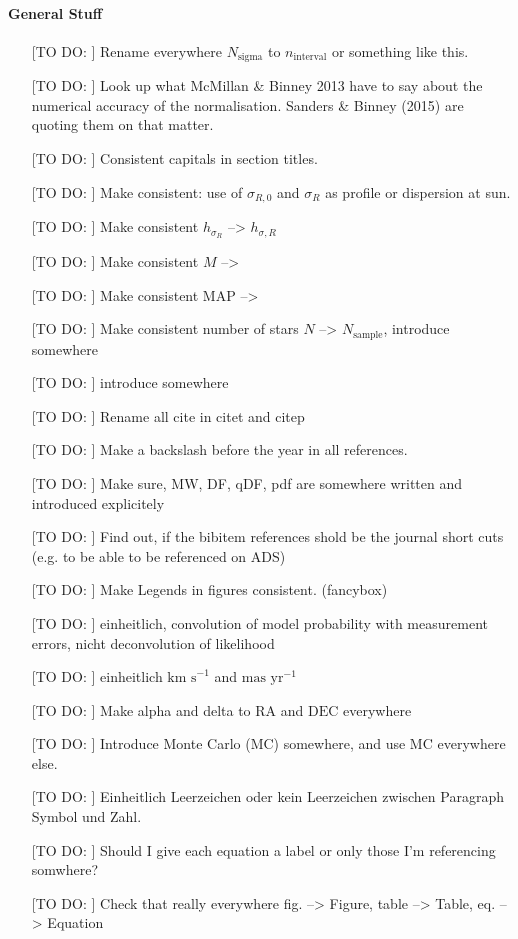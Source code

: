 \paragraph{General Stuff}
\begin{itemize}
\item[[TO DO:]] Rename everywhere $N_\text{sigma}$ to $n_\text{interval}$ or something like this.
\item[[TO DO:]] Look up what McMillan \& Binney 2013 have to say about the numerical accuracy of the normalisation. Sanders \& Binney (2015) are quoting them on that matter.
\item[[TO DO:]] Consistent capitals in section titles.
\item[[TO DO:]] Make consistent: use of $\sigma_{R,0}$ and $\sigma_R$ as profile or dispersion at sun.
\item[[TO DO:]] Make consistent $h_{\sigma_R}$ --> $h_{\sigma,R}$
\item[[TO DO:]] Make consistent $M$ --> \pmodel
\item[[TO DO:]] Make consistent MAP --> \MAP
\item[[TO DO:]] Make consistent number of stars $N$ --> $N_\text{sample}$, introduce somewhere
\item[[TO DO:]]  introduce \pdf somewhere
\item[[TO DO:]]  Rename all cite in citet and citep
\item[[TO DO:]] Make a backslash before the year in all references.
\item[[TO DO:]] Make sure, MW, DF, qDF, pdf are somewhere written and introduced explicitely
\item[[TO DO:]] Find out, if the bibitem references shold be the journal short cuts (e.g. to be able to be referenced on ADS)
\item[[TO DO:]] Make Legends in figures consistent. (fancybox)
\item[[TO DO:]] einheitlich, convolution of model probability with measurement errors, nicht deconvolution of likelihood
\item[[TO DO:]] einheitlich $\text{km s}^{-1}$ and $\text{mas yr}^{-1}$
\item[[TO DO:]] Make alpha and delta to $\text{RA}$ and $\text{DEC}$ everywhere
\item[[TO DO:]] Introduce Monte Carlo (MC) somewhere, and use MC everywhere else.
\item[[TO DO:]] Einheitlich Leerzeichen oder kein Leerzeichen zwischen Paragraph Symbol und Zahl.
\item[[TO DO:]] Should I give each equation a label or only those I'm referencing somwhere?
\item[[TO DO:]] Check that really everywhere fig. --> Figure, table --> Table, eq. --> Equation
\end{itemize}

